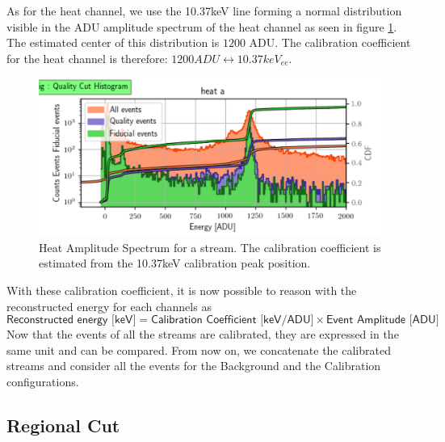 As for the heat channel, we use the 10.37keV line forming a normal distribution visible in the ADU amplitude spectrum of the heat channel as seen in figure \ref{fig:calibration-heat}. The estimated center of this distribution is $1200$ ADU. The calibration coefficient for the heat channel is therefore: $1200 ADU \leftrightarrow 10.37 keV_{ee}$.

\begin{figure}
\centering
\includegraphics[width=\linewidth,]{Figures/Neutron/calibration_heat.png}
\caption{Heat Amplitude Spectrum for a stream. The calibration coefficient is estimated from the 10.37keV calibration peak position.}
\label{fig:calibration-heat}
\end{figure}

With these calibration coefficient, it is now possible to reason with the reconstructed energy for each channels as
$$
\textsf{Reconstructed energy [keV]}
=
\textsf{Calibration Coefficient [keV/ADU]}
\times
\textsf{Event Amplitude [ADU]}
$$
Now that the events of all the streams are calibrated, they are expressed in the same unit and can be compared. From now on, we concatenate the calibrated streams and consider all the events for the Background and the Calibration configurations.

\subsection{Regional Cut}
\label{par:fiducial-cut}

